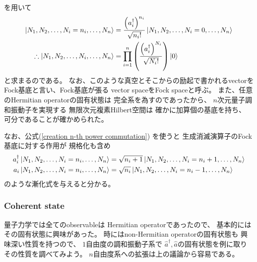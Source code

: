 を用いて
\begin{align}
    \ket{N_1, N_2,\dots,N_i=n_i,\dots, N_n}
    &=
    \dfrac{
        \left(
            a_i^\dagger
        \right)^{n_i}
    }{\sqrt{n_i!}}
    \ket{N_1, N_2,\dots,
    N_i = 0,
    \dots, N_n}
\notag\\\therefore
    \ket{N_1, N_2,\dots,N_i,\dots, N_n}
    &=
    \prod_{i=1}^n
    \left(
        \dfrac{
            \left(
                a_i^\dagger
            \right)^{N_i}
        }{\sqrt{N_i!}}
    \right)
    \ket{0}
\label{fock basis of harmonic oscillator}
\end{align}
と求まるのである。
なお、このような真空とそこからの励起で書かれるvectorを
Fock基底と言い、Fock基底が張る
vector spaceをFock spaceと呼ぶ。
また、任意のHermitian operatorの固有状態は
完全系を為すのであったから、
$n$次元量子調和振動子を実現する
無限次元複素Hilbert空間は
確かに加算個の基底を持ち、
可分であることが確かめられた。

なお、公式(\ref{creation n-th power commutation})
を使うと
生成消滅演算子のFock基底に対する作用が
規格化も含め
\begin{subequations}
\begin{align}
    a_i^\dagger
    \ket{N_1, N_2,\dots,N_i=n_i,\dots, N_n}
    &=
    \sqrt{n_i+1}
    \ket{N_1, N_2,\dots,N_i=n_i+1,\dots, N_n}
\\
    a_i
    \ket{N_1, N_2,\dots,N_i=n_i,\dots, N_n}
    &=
    \sqrt{n_i}
    \ket{N_1, N_2,\dots,N_i=n_i-1,\dots, N_n}
\end{align}
\end{subequations}
のような漸化式を与えると分かる。

\subsubsection{Coherent state}

量子力学では全てのobservableは
Hermitian operatorであったので、
基本的にはその固有状態に興味があった。
時にはnon-Hermitian operatorの固有状態も
興味深い性質を持つので、
$1$自由度の調和振動子系で
$\hat{a}^\dagger, \hat{a}$の固有状態を例に取り
その性質を調べてみよう。
$n$自由度系への拡張は上の議論から容易である。

